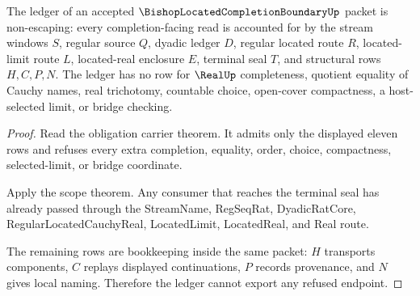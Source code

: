 \begin{theorem}
\label{thm:bishop-located-completion-boundary-ledger}
The ledger of an accepted $\BishopLocatedCompletionBoundaryUp$ packet is non-escaping: every completion-facing read is accounted for by the stream windows $S$, regular source $Q$, dyadic ledger $D$, regular located route $R$, located-limit route $L$, located-real enclosure $E$, terminal seal $T$, and structural rows $H,C,P,N$. The ledger has no row for $\RealUp$ completeness, quotient equality of Cauchy names, real trichotomy, countable choice, open-cover compactness, a host-selected limit, or bridge checking.
\end{theorem}
\begin{proof}
Read the obligation carrier theorem. It admits only the displayed eleven rows and refuses every extra completion, equality, order, choice, compactness, selected-limit, or bridge coordinate.

Apply the scope theorem. Any consumer that reaches the terminal seal has already passed through the StreamName, RegSeqRat, DyadicRatCore, RegularLocatedCauchyReal, LocatedLimit, LocatedReal, and Real route.

The remaining rows are bookkeeping inside the same packet: $H$ transports components, $C$ replays displayed continuations, $P$ records provenance, and $N$ gives local naming. Therefore the ledger cannot export any refused endpoint.
\end{proof}

